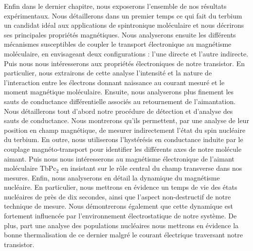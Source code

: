 Enfin dans le dernier chapitre, nous exposerons l'ensemble de nos résultats expérimentaux. Nous détaillerons dans un premier temps ce qui fait du terbium un candidat idéal aux applications de spintronique moléculaire et nous décrirons ses principales propriétés magnétiques. Nous analyserons ensuite les différents mécanismes susceptibles de coupler le transport électronique au magnétisme moléculaire, en envisageant deux configurations : l'une directe et l'autre indirecte. Puis nous nous intéresserons aux propriétés électroniques de notre transistor. En particulier, nous extrairons de cette analyse l'intensité et la nature de l'interaction entre les électrons donnant naissance au courant mesuré et le moment magnétique moléculaire. Ensuite, nous analyserons plus finement les sauts de conductance différentielle associés au retournement de l'aimantation. Nous détaillerons tout d'abord notre procédure de détection et d'analyse des sauts de conductance. Nous montrerons qu'ils permettent, par une analyse de leur position en champ magnétique, de mesurer indirectement l’état du spin nucléaire du terbium. En outre, nous utiliserons l'hystérésis en conductance induite par le couplage magnéto-transport pour identifier les différents axes de notre molécule aimant. Puis nous nous intéresserons au magnétisme électronique de l'aimant moléculaire TbPc$_{2}$ en insistant sur le rôle central du champ transverse dans nos mesures. Enfin, nous analyserons en détail la dynamique du magnétisme nucléaire. En particulier, nous mettrons en évidence un temps de vie des états nucléaires de près de dix secondes, ainsi que l'aspect non-destructif de notre technique de mesure. Nous démontrerons également que cette dynamique est fortement influencée par l'environnement électrostatique de notre système. De plus, part une analyse des populations nucléaires nous mettrons en évidence la bonne thermalisation de ce dernier malgré le courant électrique traversant notre transistor.